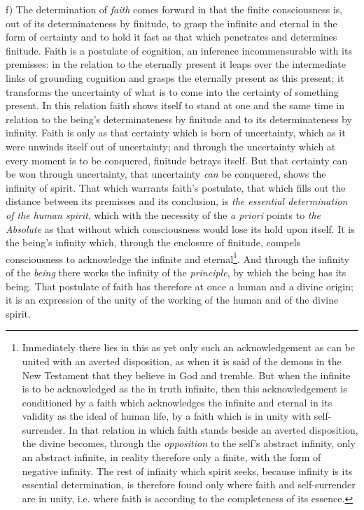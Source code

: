 \documentclass[12pt,a4paper]{book}
\begin{document}
f) The determination of \emph{faith} comes forward in that the finite
consciousness is, out of its determinateness by finitude, to grasp the
infinite and eternal in the form of certainty and to hold it fast as that
which penetrates and determines finitude. Faith is a postulate of cognition,
an inference incommensurable with its premisses: in the relation to the
eternally present it leaps over the intermediate links of grounding cognition
and grasps the eternally present as this present; it transforms the
uncertainty of what is to come into the certainty of something present. In
this relation faith shows itself to stand at one and the same time in relation
to the being's determinateness by finitude and to its determinateness by
infinity. Faith is only as that certainty which is born of uncertainty, which
as it were unwinds itself out of uncertainty; and through the uncertainty
which at every moment is to be conquered, finitude betrays itself. But that
certainty can be won through
\setcounter{footnote}{0}%
uncertainty, that uncertainty \emph{can} be conquered, shows the infinity of
spirit. That which warrants faith's postulate, that which fills out the
distance between its premisses and its conclusion, is \emph{the essential
determination of the human spirit}, which with the necessity of the
\emph{a priori} points to \emph{the Absolute} as that without which
consciousness would lose its hold upon itself. It is the being's infinity
which, through the enclosure of finitude, compels consciousness to acknowledge
the infinite and eternal\footnote{Immediately there lies in this as yet only
such an acknowledgement as can be united with an averted disposition, as when
it is said of the demons in the New Testament that they believe in God and
tremble. But when the infinite is to be acknowledged as the in truth infinite,
then this acknowledgement is conditioned by a faith which acknowledges the
infinite and eternal in its validity as the ideal of human life, by a faith
which is in unity with self-surrender. In that relation in which faith stands
beside an averted disposition, the divine becomes, through the
\emph{opposition} to the self's abstract infinity, only an abstract infinite,
in reality therefore only a finite, with the form of negative infinity. The
rest of infinity which spirit seeks, because infinity is its essential
determination, is therefore found only where faith and self-surrender are in
unity, i.e. where faith is according to the completeness of its essence.}. And
through the infinity of the \emph{being} there works the infinity of the
\emph{principle}, by which the being has its being. That postulate of faith
has therefore at once a human and a divine origin; it is an expression of the
unity of the working of the human and of the divine spirit.
\end{document}
